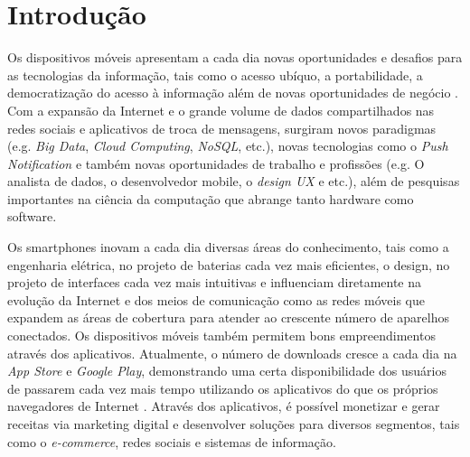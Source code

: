 \section{Introdução}\label{sec:introducao}
Os dispositivos móveis apresentam a cada dia novas oportunidades e desafios para as tecnologias da informação, tais como o acesso ubíquo, a portabilidade, a democratização do acesso à informação além de novas oportunidades de negócio \cite{levy_2002}. Com a expansão da Internet e o grande volume de dados compartilhados nas redes sociais e aplicativos de troca de mensagens, surgiram novos paradigmas (e.g. \textit{Big Data}, \textit{Cloud Computing}, \textit{NoSQL}, etc.), novas tecnologias como o \textit{Push Notification} e também novas oportunidades de trabalho e profissões (e.g. O analista de dados, o desenvolvedor mobile, o \textit{design UX} e etc.), além de pesquisas importantes na ciência da computação que abrange tanto hardware como software.\par

Os smartphones inovam a cada dia diversas áreas do conhecimento, tais como a engenharia elétrica, no projeto de baterias cada vez mais eficientes, o design, no projeto de interfaces cada vez mais intuitivas e influenciam diretamente na evolução da Internet e dos meios de comunicação como as redes móveis que expandem as áreas de cobertura para atender ao crescente número de aparelhos conectados. Os dispositivos móveis também permitem bons empreendimentos através dos aplicativos. Atualmente, o número de downloads cresce a cada dia na \textit{App Store} e \textit{Google Play}, demonstrando uma certa disponibilidade dos usuários de passarem cada vez mais tempo utilizando os aplicativos do que os próprios navegadores de Internet \cite{D&T}. Através dos aplicativos, é possível monetizar e gerar receitas via marketing digital e desenvolver soluções para diversos segmentos, tais como o \textit{e-commerce}, redes sociais e sistemas de informação.\par


